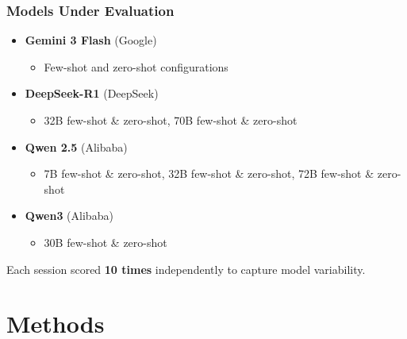\documentclass[aspectratio=169]{beamer}
\begin{document}
\begin{frame}
    \frametitle{Models Under Evaluation}
    \begin{itemize}
        \item \textbf{Gemini 3 Flash} (Google)
        \begin{itemize}
            \item Few-shot and zero-shot configurations
        \end{itemize}
        \item \textbf{DeepSeek-R1} (DeepSeek)
        \begin{itemize}
            \item 32B few-shot \& zero-shot, 70B few-shot \& zero-shot
        \end{itemize}
        \item \textbf{Qwen 2.5} (Alibaba)
        \begin{itemize}
            \item 7B few-shot \& zero-shot, 32B few-shot \& zero-shot, 72B few-shot \& zero-shot
        \end{itemize}
        \item \textbf{Qwen3} (Alibaba)
        \begin{itemize}
            \item 30B few-shot \& zero-shot
        \end{itemize}
    \end{itemize}
    \vspace{0.5em}
    Each session scored \textbf{10 times} independently to capture model variability.
\end{frame}


\section{Methods}
\end{document}
